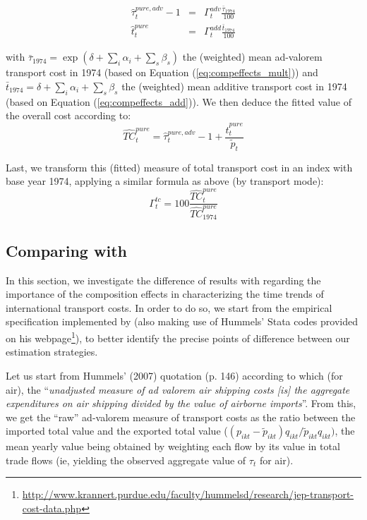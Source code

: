 \documentclass[a4paper,11pt]{article}
\begin{document}
\begin{eqnarray*}
\widehat{\tau}^{pure, adv}_t -1 &=&\Gamma^{adv}_t \frac{\bar{\tau}_{1974} }{100} \\
\widehat{t}^{pure}_t &=& \Gamma^{add}_t\frac{\bar{t}_{1974}}{100}
\end{eqnarray*}



\noindent with $\bar{\tau}_{1974} = \exp(\delta + \sum_i \alpha_i + \sum_s \beta_s)$ the (weighted) mean ad-valorem transport cost in 1974 (based on Equation (\ref{eq:compeffects_mult})) and $\bar{t}_{1974} = \delta + \sum_i \alpha_i + \sum_s \beta_s$ the (weighted) mean additive transport cost in 1974 (based on Equation (\ref{eq:compeffects_add})). We then deduce the fitted value of the overall cost according to:
$$\widehat{TC}^{pure}_t= \widehat{\tau}^{pure, adv}_t -1 + \frac{\widehat{t}^{pure}_t}{\widetilde{p}_t}$$

Last, we transform this (fitted) measure of total transport cost in an index with base year 1974, applying a similar formula as above (by transport mode):
$$\Gamma^{tc}_t = 100\frac{\widehat{TC}^{pure}_t}{\widehat{TC}^{pure}_{1974}}$$


\subsection{Comparing with \cite{hummels2007} \label{app:compare_Hummels}}

In this section, we investigate the difference of results with \cite{hummels2007} regarding the importance of the composition effects in characterizing the time trends of international transport costs.
In order to do so, we start from the empirical specification implemented by \cite{hummels2007} (also making use of Hummels' Stata codes provided on his webpage\footnote{\url{http://www.krannert.purdue.edu/faculty/hummelsd/research/jep-transport-cost-data.php}}), to better identify the precise points of difference between our estimation strategies.

Let us start from Hummels' (2007) quotation (p.
146) according to which (for air), the ``\textit{unadjusted measure of ad valorem air shipping costs [is] the aggregate expenditures on air shipping divided by the value of airborne imports}''.
From this, we get the ``raw'' ad-valorem measure of transport costs as the ratio between the imported total value and the exported total value ($(p_{ikt} - \widetilde{p}_{ikt})q_{ikt}/\widetilde{p}_{ikt}q_{ikt})$, the mean yearly value being obtained by weighting each flow by its value in total trade flows (ie, yielding the observed aggregate value of $\tau_t$ for air).
\end{document}
